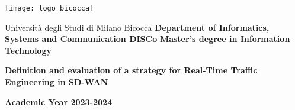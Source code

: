 	\begin{titlepage}
	\begin{flushleft}
		\begin{minipage}[t][6cm][t]{3.5cm}
			\texttt{[image: logo\_bicocca]}
		\end{minipage}
		\begin{minipage}[b][3cm][b]{0.75\textwidth}
			\vspace{0.2cm}
			Università degli Studi di Milano Bicocca
			\vfill
			\textbf {Department of Informatics, Systems and Communication DISCo}
			\vfill
			\textbf{Master's degree in Information Technology}
			\vspace{0.2cm}
		\end{minipage}	
	\end{flushleft}
	
	\vfill
	\begin{center}
		\vspace*{1cm}
		
		\textbf{\Large Definition and evaluation of a strategy for Real-Time Traffic Engineering in SD-WAN ​
		}
	\end{center}
	
	
	\vspace{4.5cm}
	
	
	\vfill
	

	\begin{center}
	\vspace*{1cm}
	
	\textbf{Academic Year 2023-2024}
	\end{center}
	
	
	
	
\end{titlepage}